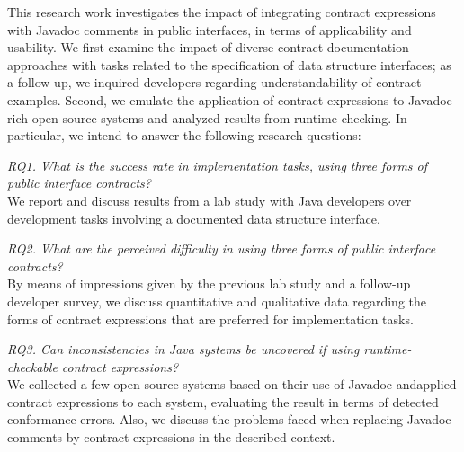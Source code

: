 This research work investigates the impact of integrating contract expressions with Javadoc comments in public interfaces, in terms of applicability and usability. We first examine the impact of diverse contract documentation approaches with tasks related to the specification of data structure interfaces; as a follow-up, we inquired developers regarding understandability of contract examples. Second, we emulate the application of contract expressions to Javadoc-rich open source systems and analyzed results from runtime checking. In particular, we intend to answer the following research questions:  

\noindent\emph{RQ1. What is the success rate in implementation tasks, using three forms of public interface contracts?}\\
We report and discuss results from a lab study with Java developers over development tasks involving a documented data structure interface.

  
\noindent\emph{RQ2. What are the perceived difficulty in using three forms of public interface contracts?}\\
By means of impressions given by the previous lab study and a follow-up developer survey, we discuss quantitative and qualitative data regarding the forms of contract expressions that are preferred for implementation tasks.


\noindent\emph{RQ3. Can inconsistencies in Java systems be uncovered if using runtime-checkable contract expressions?}\\
We collected a few open source systems based on their use of Javadoc andapplied contract expressions
to each system, evaluating the result in terms of detected conformance errors. Also, we discuss the problems faced when replacing Javadoc comments by contract expressions in the described context.

